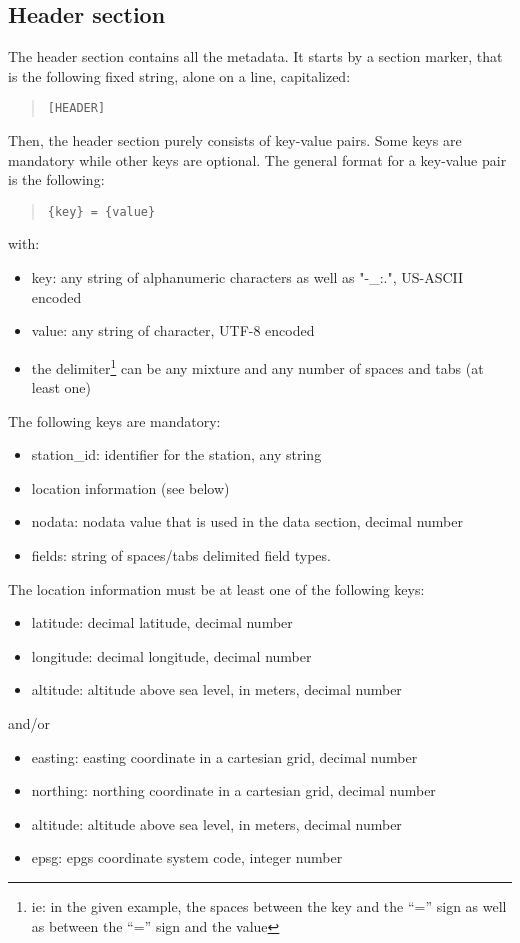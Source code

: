 \documentclass[a4paper,10pt]{article}
\begin{document}
\subsection{Header section}
The header section contains all the metadata. It starts by a section marker, that is the following fixed string, alone on a line, capitalized:
\begin{quote} \begin{verbatim}
[HEADER]
\end{verbatim}\end{quote}
Then, the header section purely consists of key-value pairs. Some keys are mandatory while other keys are optional. The general format for a key-value pair is the following:
\begin{quote} \begin{verbatim}
{key} = {value}
\end{verbatim}\end{quote}
with:
\begin{itemize}
	\item key: any string of alphanumeric characters as well as "-\_:.", US-ASCII encoded
	\item value: any string of character, UTF-8 encoded
	\item the delimiter\footnote{ie: in the given example, the spaces between the key and the ``='' sign as well as between the ``='' sign and the value} can be any mixture and any number of spaces and tabs (at least one)
\end{itemize}
The following keys are mandatory:
\begin{itemize}
	\item station\_id: identifier for the station, any string
	\item location information (see below)
	\item nodata: nodata value that is used in the data section, decimal number
	\item fields: string of spaces/tabs delimited field types.
\end{itemize}
The location information must be at least one of the following keys:
\begin{itemize}
	\item latitude: decimal latitude, decimal number
	\item longitude: decimal longitude, decimal number
	\item altitude: altitude above sea level, in meters, decimal number
\end{itemize}
and/or
\begin{itemize}
	\item easting: easting coordinate in a cartesian grid, decimal number
	\item northing: northing coordinate in a cartesian grid, decimal number
	\item altitude: altitude above sea level, in meters, decimal number
	\item epsg: epgs coordinate system code, integer number
\end{itemize}
\end{document}
